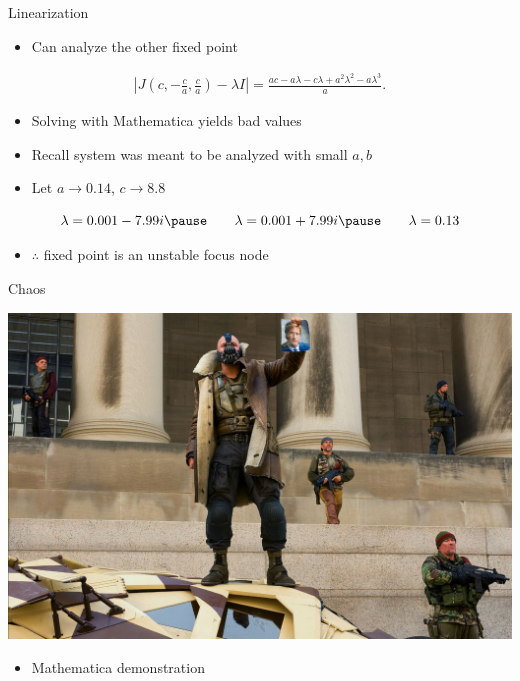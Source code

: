 \documentclass{beamer}
\begin{document}
\begin{frame}{Linearization}
	\begin{itemize}
		\item Can analyze the other fixed point
		\pause
	\end{itemize}
	\begin{gather*}
		\left|J\left(c,-\frac{c}{a},\frac{c}{a}\right) -\lambda I\right| =
		\frac{ ac - a\lambda - c\lambda + a^{2}\lambda^{2} -a\lambda^{3}}{a}.
	\end{gather*}
	\pause
	\begin{itemize}
		\item Solving with Mathematica yields bad values
		\pause
		\item Recall system was meant to be analyzed with small $a,b$
		\pause
		\item Let $a\to0.14$, $c\to8.8$
	\end{itemize}
	\pause
	\[
		\lambda =0.001-7.99i\pause\qquad \lambda=0.001+7.99i\pause\qquad\lambda=0.13
	\]
	\pause
	\begin{itemize}
		\item $\therefore$ fixed point is an unstable focus node
	\end{itemize}
\end{frame}

\begin{frame}{Chaos}
	\begin{center}
		\includegraphics[scale=0.2]{bane}
	\end{center}
	\pause
	\begin{itemize}
		\item Mathematica demonstration
	\end{itemize}
\end{frame}
\end{document}
